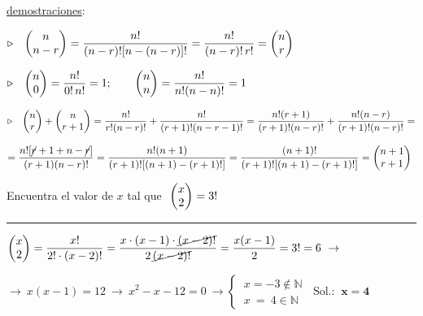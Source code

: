 \color{gris}
\begin{small}
\underline{demostraciones}:

\vspace{2mm} $\triangleright \quad \mqty(n\\n-r)=\dfrac{n!}{(n-r)![n-(n-r)]!}=\dfrac{n!}{(n-r)!\, r!}=\mqty(n\\r)\ $ \QED


\vspace{2mm} $\triangleright \quad \mqty(n\\0)=\dfrac{n!}{0! \, n!}=1;\qquad \mqty(n\\ n)=\dfrac{n!}{n!(n-n)!}=1\ $ \QED


\vspace{2mm} $\triangleright \quad  \mqty(n\\r)+\mqty(n\\r+1)=\dfrac{n!}{r!(n-r)!}+\dfrac{n!}{(r+1)!(n-r-1)!}= \dfrac{n!(r+1)}{(r+1)!(n-r)!}+\dfrac{n!(n-r)}{(r+1)!(n-r)!}=$

$= \dfrac{n![\cancel{r}+1+n-\cancel{r}]}{(r+1)(n-r)!}=\dfrac{n!(n+1)}{(r+1)![(n+1)-(r+1)!]}=\dfrac{(n+1)!}{(r+1)![(n+1)-(r+1)!]}=\mqty(n+1\\r+1)\ $ \QED

\end{small}

\color{black}

\vspace{5mm}
\begin{miejercicio}

Encuentra el valor de $x$ tal que $\ \mqty(x\\2)=3!$

\vspace{2mm} 
\rule{300pt}{0.1pt}

\vspace{2mm} $\mqty(x\\2)=\dfrac{x!}{2!\cdot (x-2)!}=\dfrac{x\cdot(x-1)\cdot\cancel{ (x-2)!}}{2\, \cancel{(x-2)!}}=\dfrac{x(x-1)}{2}=3!=6 \ \to $

\vspace{2mm} $\to \ x(x-1)=12 \ \to \ x^2-x-12=0 \ \to \begin{cases}
 \ x=-3 \notin \mathbb N \\ \ x\ =\ 4 \in \mathbb N	
 \end{cases} \ \text{ Sol.: } \ \boldsymbol{x=4}$	
\end{miejercicio}

